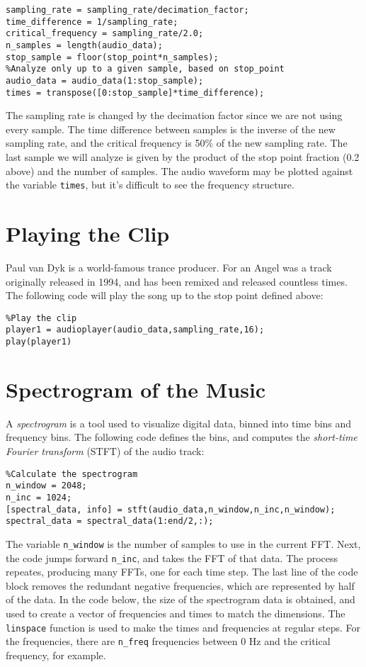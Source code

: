 \documentclass[12pt]{article}
\begin{document}
\begin{verbatim}
sampling_rate = sampling_rate/decimation_factor;
time_difference = 1/sampling_rate;
critical_frequency = sampling_rate/2.0;
n_samples = length(audio_data);
stop_sample = floor(stop_point*n_samples);
%Analyze only up to a given sample, based on stop_point
audio_data = audio_data(1:stop_sample);
times = transpose([0:stop_sample]*time_difference);
\end{verbatim}

The sampling rate is changed by the decimation factor since we are not using every sample.  The time difference between samples is the inverse of the new sampling rate, and the critical frequency is 50\% of the new sampling rate.  The last sample we will analyze is given by the product of the stop point fraction (0.2 above) and the number of samples.  The audio waveform may be plotted against the variable \verb+times+, but it's difficult to see the frequency structure.

\section{Playing the Clip}

Paul van Dyk is a world-famous trance producer.  For an Angel was a track originally released in 1994, and has been remixed and released countless times.  The following code will play the song up to the stop point defined above:

\begin{verbatim}
%Play the clip
player1 = audioplayer(audio_data,sampling_rate,16);
play(player1)
\end{verbatim}

\section{Spectrogram of the Music}

A \textit{spectrogram} is a tool used to visualize digital data, binned into time bins and frequency bins.  The following code defines the bins, and computes the \textit{short-time Fourier transform} (STFT) of the audio track:

\begin{verbatim}
%Calculate the spectrogram
n_window = 2048;
n_inc = 1024;
[spectral_data, info] = stft(audio_data,n_window,n_inc,n_window);
spectral_data = spectral_data(1:end/2,:);
\end{verbatim}

The variable \verb+n_window+ is the number of samples to use in the current FFT.  Next, the code jumps forward \verb+n_inc+, and takes the FFT of that data.  The process repeates, producing many FFTs, one for each time step.  The last line of the code block removes the redundant negative frequencies, which are represented by half of the data.  In the code below, the size of the spectrogram data is obtained, and used to create a vector of frequencies and times to match the dimensions.  The \verb+linspace+ function is used to make the times and frequencies at regular steps.  For the frequencies, there are \verb+n_freq+ frequencies between 0 Hz and the critical frequency, for example.
\end{document}
